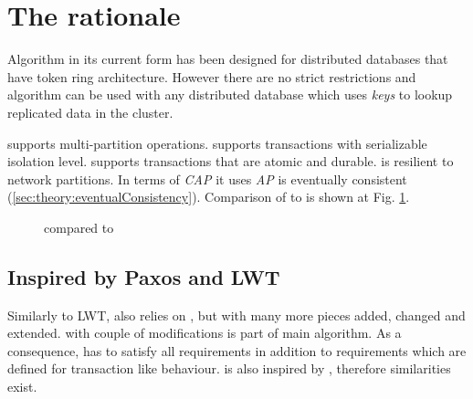 
\section{The rationale}
Algorithm \mpp in its current form has been designed for distributed databases that have token ring architecture. 
However there are no strict restrictions and algorithm can be used with any distributed database which uses \emph{keys} to lookup replicated data in the cluster. 

\mpp supports multi-partition operations.
\mpp supports transactions with serializable isolation level. 
\mpp supports transactions that are atomic and durable.
\mpp is resilient to network partitions. In terms of \emph{CAP} \cite{Brewer:2012ba} it uses \emph{AP}
\mpp is eventually consistent (\ref{sec:theory:eventualConsistency}). Comparison of \mpp to \lwt is shown at Fig. \ref{fig:mppVsLwt}.


\begin{figure}[hbt]
  \setlength{\unitlength}{1.3cm}  
  \caption{\mpp compared to \lwt}
  \label{fig:mppVsLwt}
\end{figure}




\subsection{Inspired by Paxos and LWT}
Similarly to LWT, \mpp also relies on \paxos, but with many more pieces added, changed and extended. 
\paxos with couple of modifications is part of main \mpp algorithm. As a consequence, \mpp has to satisfy all \paxos requirements in addition to requirements which are defined for transaction like behaviour. \mpp is also inspired by \lwt, therefore similarities exist.        


